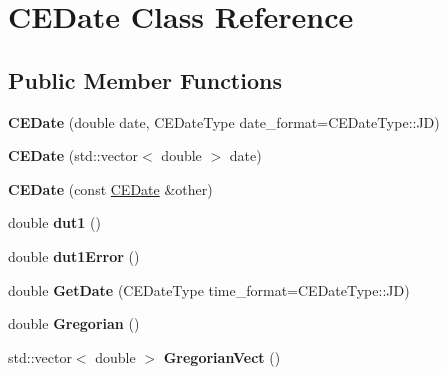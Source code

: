 \hypertarget{class_c_e_date}{}\section{C\+E\+Date Class Reference}
\label{class_c_e_date}
\subsection*{Public Member Functions}
\begin{DoxyCompactItemize}
\item 
\hypertarget{class_c_e_date_a42ecf58a60d59f5919f98e82b7a3d6cd}{}{\bfseries C\+E\+Date} (double date, C\+E\+Date\+Type date\+\_\+format=C\+E\+Date\+Type\+::\+J\+D)\label{class_c_e_date_a42ecf58a60d59f5919f98e82b7a3d6cd}

\item 
\hypertarget{class_c_e_date_a65721845bff2f508fe90ee78b8151f38}{}{\bfseries C\+E\+Date} (std\+::vector$<$ double $>$ date)\label{class_c_e_date_a65721845bff2f508fe90ee78b8151f38}

\item 
\hypertarget{class_c_e_date_a6ea4a0f640de5044d005b0eb2dcb74ea}{}{\bfseries C\+E\+Date} (const \hyperlink{class_c_e_date}{C\+E\+Date} \&other)\label{class_c_e_date_a6ea4a0f640de5044d005b0eb2dcb74ea}

\item 
\hypertarget{class_c_e_date_aa59d415dc6ea36d3fe1b09c291c7ca5c}{}double {\bfseries dut1} ()\label{class_c_e_date_aa59d415dc6ea36d3fe1b09c291c7ca5c}

\item 
\hypertarget{class_c_e_date_ae18b0156d19e87569df525588b6c8c51}{}double {\bfseries dut1\+Error} ()\label{class_c_e_date_ae18b0156d19e87569df525588b6c8c51}

\item 
\hypertarget{class_c_e_date_a4c362a8bc9738240a6820821e4d11949}{}double {\bfseries Get\+Date} (C\+E\+Date\+Type time\+\_\+format=C\+E\+Date\+Type\+::\+J\+D)\label{class_c_e_date_a4c362a8bc9738240a6820821e4d11949}

\item 
\hypertarget{class_c_e_date_a3e72cb2a53b0e29a12bc0b2f7adbefda}{}double {\bfseries Gregorian} ()\label{class_c_e_date_a3e72cb2a53b0e29a12bc0b2f7adbefda}

\item 
\hypertarget{class_c_e_date_a5e9fa4dd96005e66a8dbddc77efc9b72}{}std\+::vector$<$ double $>$ {\bfseries Gregorian\+Vect} ()\label{class_c_e_date_a5e9fa4dd96005e66a8dbddc77efc9b72}


\end{DoxyCompactItemize}
